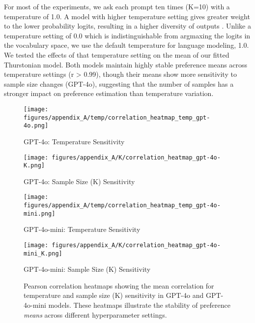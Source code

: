 For most of the experiments, we ask each prompt ten times (K=10) with a temperature of 1.0. A model with higher temperature setting gives greater weight to the lower probability logits, resulting in a higher diversity of outputs \citep{peeperkorn2024temperature}. Unlike a temperature setting of 0.0 which is indistinguishable from argmaxing the logits in the vocabulary space, we use the default temperature for language modeling, 1.0. We tested the effects of that temperature setting on the mean of our fitted Thurstonian model. Both models maintain highly stable preference means across temperature settings (r > 0.99), though their means show more sensitivity to sample size changes (GPT-4o), suggesting that the number of samples has a stronger impact on preference estimation than temperature variation.

 
\begin{figure}[h!]
    \centering
    \begin{minipage}{0.43\textwidth}
        \centering
        \texttt{[image: figures/appendix\_A/temp/correlation\_heatmap\_temp\_gpt-4o.png]}
        \caption{GPT-4o: Temperature Sensitivity}
        \label{fig:gpt4o-temp}
    \end{minipage}
    \hfill
    \begin{minipage}{0.43\textwidth}
        \centering
        \texttt{[image: figures/appendix\_A/K/correlation\_heatmap\_gpt-4o-K.png]}
        \caption{GPT-4o: Sample Size (K) Sensitivity}
        \label{fig:gpt4o-k}
    \end{minipage}
    
    \begin{minipage}{0.43\textwidth}
        \centering
        \texttt{[image: figures/appendix\_A/temp/correlation\_heatmap\_temp\_gpt-4o-mini.png]}
        \caption{GPT-4o-mini: Temperature Sensitivity}
        \label{fig:gpt4o-mini-temp}
    \end{minipage}
    \hfill
    \begin{minipage}{0.43\textwidth}
        \centering
        \texttt{[image: figures/appendix\_A/K/correlation\_heatmap\_gpt-4o-mini\_K.png]}
        \caption{GPT-4o-mini: Sample Size (K) Sensitivity}
        \label{fig:gpt4o-mini-k}
    \end{minipage}
    \caption{Pearson correlation heatmaps showing the mean correlation for temperature and sample size (K) sensitivity in GPT-4o and GPT-4o-mini models. These heatmaps illustrate the stability of preference \textit{means} across different hyperparameter settings.}
    \label{fig:correlation-heatmaps}
\end{figure}


